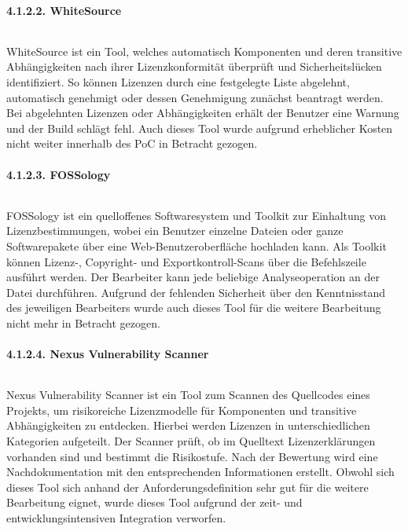 \paragraph{4.1.2.2. WhiteSource} $~$

WhiteSource ist ein Tool, welches automatisch Komponenten und deren transitive Abhängigkeiten nach ihrer Lizenzkonformität überprüft und Sicherheitslücken identifiziert. \cite{whitesource_software_whitesource_2021} So können Lizenzen durch eine festgelegte Liste abgelehnt, automatisch genehmigt oder dessen Genehmigung zunächst beantragt werden. Bei abgelehnten Lizenzen oder Abhängigkeiten erhält der Benutzer eine Warnung und der Build schlägt fehl. Auch dieses Tool wurde aufgrund erheblicher Kosten nicht weiter innerhalb des PoC in Betracht gezogen. 

\paragraph{4.1.2.3. FOSSology} $~$

FOSSology ist ein quelloffenes Softwaresystem und Toolkit zur Einhaltung von Lizenzbestimmungen, wobei ein Benutzer einzelne Dateien oder ganze Softwarepakete über eine Web-Benutzeroberfläche hochladen kann. \cite{fossology_workgroup_fossology_2017} Als Toolkit können Lizenz-, Copyright- und Exportkontroll-Scans über die Befehlszeile ausführt werden. Der Bearbeiter kann jede beliebige Analyseoperation an der Datei durchführen. Aufgrund der fehlenden Sicherheit über den Kenntnisstand des jeweiligen Bearbeiters wurde auch dieses Tool für die weitere Bearbeitung nicht mehr in Betracht gezogen. 

\paragraph{4.1.2.4. Nexus Vulnerability Scanner} $~$

Nexus Vulnerability Scanner ist ein Tool zum Scannen des Quellcodes eines Projekts, um risikoreiche Lizenzmodelle für Komponenten und transitive Abhängigkeiten zu entdecken. \cite{sonatype_nexus_2008} Hierbei werden Lizenzen in unterschiedlichen Kategorien aufgeteilt. Der Scanner prüft, ob im Quelltext Lizenzerklärungen vorhanden sind und bestimmt die Risikostufe. \cite{sonatype_guide_nodate} Nach der Bewertung wird eine Nachdokumentation mit den entsprechenden Informationen erstellt. Obwohl sich dieses Tool sich anhand der Anforderungsdefinition sehr gut für die weitere Bearbeitung eignet, wurde dieses Tool aufgrund der zeit- und entwicklungsintensiven Integration verworfen.

